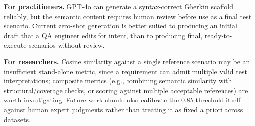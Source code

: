\textbf{For practitioners.}
GPT-4o can generate a syntax-correct Gherkin scaffold reliably, but the semantic content requires human review before use as a final test scenario.
Current zero-shot generation is better suited to producing an initial draft that a QA engineer edits for intent, than to producing final, ready-to-execute scenarios without review.

\textbf{For researchers.}
Cosine similarity against a single reference scenario may be an insufficient stand-alone metric, since a requirement can admit multiple valid test interpretations; composite metrics (e.g., combining semantic similarity with structural/coverage checks, or scoring against multiple acceptable references) are worth investigating.
Future work should also calibrate the 0.85 threshold itself against human expert judgments rather than treating it as fixed a priori across datasets.
